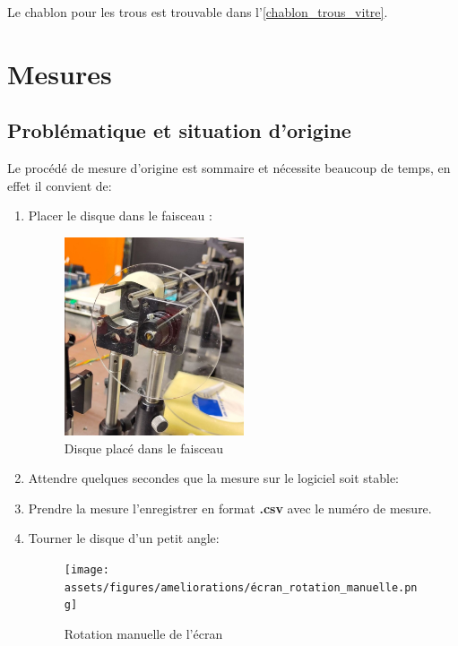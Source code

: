 Le chablon pour les trous est trouvable dans l'\autoref{chablon_trous_vitre}.
\newpage
\section{Mesures}
\subsection{Problématique et situation d'origine}
Le procédé de mesure d'origine est sommaire et nécessite beaucoup de temps, en effet il convient de:
\begin{enumerate}
    \item Placer le disque dans le faisceau :
          \begin{figure}[H]
              \centering
              \includegraphics[width=0.5\textwidth]{assets/figures/ameliorations/disque_fixe.jpeg}
              \caption{Disque placé dans le faisceau}\label{fig:disque_fixe}
          \end{figure}

    \item Attendre quelques secondes que la mesure sur le logiciel soit stable:

    \item Prendre la mesure l'enregistrer en format \textbf{.csv} avec le numéro de mesure.

    \item Tourner le disque d'un petit angle:
          \begin{figure}[H]
              \centering
              \texttt{[image: assets/figures/ameliorations/écran\_rotation\_manuelle.png]}
              \caption{Rotation manuelle de l'écran}\label{fig:rotation_manuelle}
          \end{figure}
\end{enumerate}


